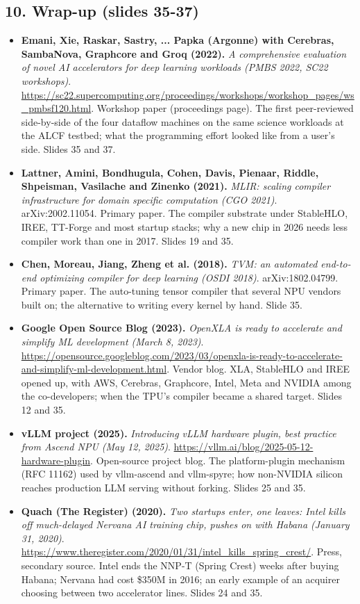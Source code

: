 \subsection*{10. Wrap-up (slides 35-37)}
\begin{itemize}[leftmargin=1.2em,itemsep=3pt]\sloppy
\item \textbf{Emani, Xie, Raskar, Sastry, ... Papka (Argonne) with Cerebras, SambaNova, Graphcore and Groq (2022).} \textit{A comprehensive evaluation of novel AI accelerators for deep learning workloads (PMBS 2022, SC22 workshops)}. \url{https://sc22.supercomputing.org/proceedings/workshops/workshop_pages/ws_pmbsf120.html}. Workshop paper (proceedings page). The first peer-reviewed side-by-side of the four dataflow machines on the same science workloads at the ALCF testbed; what the programming effort looked like from a user's side. Slides 35 and 37.
\item \textbf{Lattner, Amini, Bondhugula, Cohen, Davis, Pienaar, Riddle, Shpeisman, Vasilache and Zinenko (2021).} \textit{MLIR: scaling compiler infrastructure for domain specific computation (CGO 2021)}. arXiv:2002.11054. Primary paper. The compiler substrate under StableHLO, IREE, TT-Forge and most startup stacks; why a new chip in 2026 needs less compiler work than one in 2017. Slides 19 and 35.
\item \textbf{Chen, Moreau, Jiang, Zheng et al. (2018).} \textit{TVM: an automated end-to-end optimizing compiler for deep learning (OSDI 2018)}. arXiv:1802.04799. Primary paper. The auto-tuning tensor compiler that several NPU vendors built on; the alternative to writing every kernel by hand. Slide 35.
\item \textbf{Google Open Source Blog (2023).} \textit{OpenXLA is ready to accelerate and simplify ML development (March 8, 2023)}. \url{https://opensource.googleblog.com/2023/03/openxla-is-ready-to-accelerate-and-simplify-ml-development.html}. Vendor blog. XLA, StableHLO and IREE opened up, with AWS, Cerebras, Graphcore, Intel, Meta and NVIDIA among the co-developers; when the TPU's compiler became a shared target. Slides 12 and 35.
\item \textbf{vLLM project (2025).} \textit{Introducing vLLM hardware plugin, best practice from Ascend NPU (May 12, 2025)}. \url{https://vllm.ai/blog/2025-05-12-hardware-plugin}. Open-source project blog. The platform-plugin mechanism (RFC 11162) used by vllm-ascend and vllm-spyre; how non-NVIDIA silicon reaches production LLM serving without forking. Slides 25 and 35.
\item \textbf{Quach (The Register) (2020).} \textit{Two startups enter, one leaves: Intel kills off much-delayed Nervana AI training chip, pushes on with Habana (January 31, 2020)}. \url{https://www.theregister.com/2020/01/31/intel_kills_spring_crest/}. Press, secondary source. Intel ends the NNP-T (Spring Crest) weeks after buying Habana; Nervana had cost \$350M in 2016; an early example of an acquirer choosing between two accelerator lines. Slides 24 and 35.

\end{itemize}
